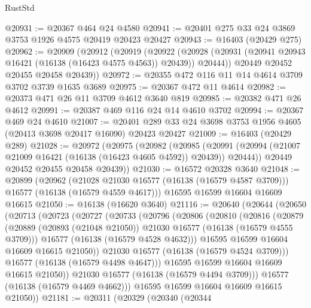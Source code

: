 \begin{lexlean}{RustStd}
\begin{coremodule}
@20931 := @20367 @464 @24 @4580
@20941 := @20401 @275 @33 @24 @3869 @3753 @1926 @4575 @20419 @20423 @20427
@20943 := @16403 (@20429 @275)
@20962 := @20909
    (@20912
      (@20919
        (@20922
          (@20928 (@20931 (@20941 @20943 @16421 (@16138 (@16423 @4575 @4563)) @20439)) @20444))
        @20449
        @20452
        @20455
        @20458
        @20439))
@20972 := @20355 @472 @116 @11 @14 @4614 @3709 @3702 @3739 @1635 @3689
@20975 := @20367 @472 @11 @4614
@20982 := @20373 @471 @26 @11 @3709 @4612 @3640 @819
@20985 := @20382 @471 @26 @4612
@20991 := @20387 @469 @116 @24 @14 @4610 @3702
@20994 := @20367 @469 @24 @4610
@21007 := @20401 @289 @33 @24 @3698 @3753 @1956 @4605 (@20413 @3698 @20417 @16090) @20423 @20427
@21009 := @16403 (@20429 @289)
@21028 := @20972
    (@20975
      (@20982
        (@20985
          (@20991 (@20994 (@21007 @21009 @16421 (@16138 (@16423 @4605 @4592)) @20439)) @20444))
        @20449
        @20452
        @20455
        @20458
        @20439))
@21030 := @16572 @20328 @3640
@21048 := @20899
    (@20962
      (@21028 @21030 @16577 (@16138 (@16579 @4587 @3709)))
      @16577
      (@16138 (@16579 @4559 @4617)))
    @16595
    @16599
    @16604
    @16609
    @16615
@21050 := @16138 (@16620 @3640)
@21116 := @20640
    (@20644
      (@20650
        (@20713
          (@20723
            (@20727
              (@20733
                (@20796
                  (@20806
                    (@20810
                      (@20816
                        (@20879
                          (@20889
                            (@20893 (@21048 @21050))
                            @21030
                            @16577
                            (@16138 (@16579 @4555 @3709)))
                          @16577
                          (@16138 (@16579 @4528 @4632)))
                        @16595
                        @16599
                        @16604
                        @16609
                        @16615
                        @21050))
                    @21030
                    @16577
                    (@16138 (@16579 @4524 @3709)))
                  @16577
                  (@16138 (@16579 @4498 @4647)))
                @16595
                @16599
                @16604
                @16609
                @16615
                @21050))
            @21030
            @16577
            (@16138 (@16579 @4494 @3709)))
          @16577
          (@16138 (@16579 @4469 @4662)))
        @16595
        @16599
        @16604
        @16609
        @16615
        @21050))
@21181 := @20311
    (@20329
      (@20340
        (@20344

\end{coremodule}
\end{lexlean}
